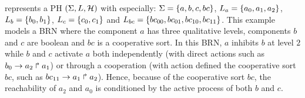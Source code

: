 \begin{example*}
 represents a PH $(\Sigma,L,\mathcal{H})$ with especially:
$\Sigma = \{a,b,c,bc\}$,
$L_a = \{a_0,a_1,a_2\}$,
$L_b = \{b_0, b_1\}$,
$L_c = \{c_0, c_1\}$ and
$L_{bc} = \{bc_{00}, bc_{01}, bc_{10}, bc_{11}\}$.
This example models a BRN where the component $a$ has three qualitative levels, components $b$ and $c$ are boolean and $bc$ is a cooperative sort.
In this BRN, $a$ inhibits $b$ at level $2$ while $b$ and $c$ activate $a$ both independently (with direct actions such as
$b_0\rightarrow a_2\Rsh a_1$) or through a cooperation (with action defined the cooperative sort $bc$, such as
$bc_{11}\rightarrow a_1\Rsh a_2$).
Hence, because of the cooperative sort $bc$, the reachability of $a_2$ and $a_0$ is conditioned by the active process of both $b$ and $c$.
\end{example*}
